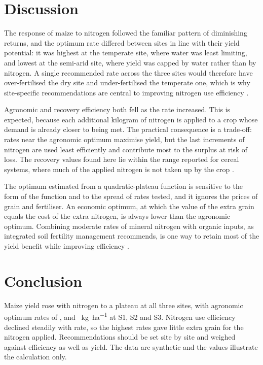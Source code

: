 \section{Discussion}

The response of maize to nitrogen followed the familiar pattern of
diminishing returns, and the optimum rate differed between sites in line with
their yield potential: it was highest at the temperate site, where water was
least limiting, and lowest at the semi-arid site, where yield was capped by
water rather than by nitrogen. A single recommended rate across the three sites
would therefore have over-fertilised the dry site and under-fertilised the
temperate one, which is why site-specific recommendations are central to
improving nitrogen use efficiency \parencite{cassman2002}.

Agronomic and recovery efficiency both fell as the rate increased. This is
expected, because each additional kilogram of nitrogen is applied to a crop
whose demand is already closer to being met. The practical consequence is a
trade-off: rates near the agronomic optimum maximise yield, but the last
increments of nitrogen are used least efficiently and contribute most to the
surplus at risk of loss. The recovery values found here lie within the range
reported for cereal systems, where much of the applied nitrogen is not taken
up by the crop \parencite{ladha2005}.

The optimum estimated from a quadratic-plateau function is sensitive to the
form of the function and to the spread of rates tested, and it ignores the
prices of grain and fertiliser. An economic optimum, at which the value of the
extra grain equals the cost of the extra nitrogen, is always lower than the
agronomic optimum. Combining moderate rates of mineral nitrogen with organic
inputs, as integrated soil fertility management recommends, is one way to
retain most of the yield benefit while improving efficiency
\parencite{vanlauwe2010}.

\section{Conclusion}

Maize yield rose with nitrogen to a plateau at all three sites, with agronomic
optimum rates of ,  and
~\si{\kilo\gram\per\hectare} at S1, S2 and S3. Nitrogen use
efficiency declined steadily with rate, so the highest rates gave little extra
grain for the nitrogen applied. Recommendations should be set site by site and
weighed against efficiency as well as yield. The data are synthetic and the
values illustrate the calculation only.
